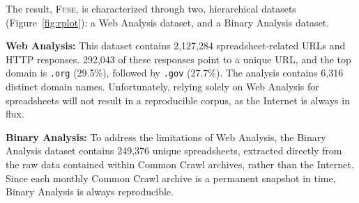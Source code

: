 \documentclass{svjour3}
\newcommand{\urlcount}{2,127,284}
\newcommand{\xlscount}{249,376}
\begin{document}

The result, \textsc{Fuse}, is characterized through two, hierarchical datasets (Figure~\ref{fig:rplot}): a Web Analysis dataset, and a Binary Analysis dataset.

\textbf{Web Analysis:} This dataset contains \urlcount{} spreadsheet-related URLs and HTTP responses. 292,043 of these responses point to a unique URL, and the top domain is \texttt{.org} (29.5\%), followed by \texttt{.gov} (27.7\%). The analysis contains 6,316 distinct domain names. Unfortunately, relying solely on Web Analysis for spreadsheets will not result in a reproducible corpus, as the Internet is always in flux.



\textbf{Binary Analysis:}  To address the limitations of Web Analysis, the Binary Analysis dataset contains \xlscount{} unique spreadsheets, extracted directly from the raw data contained within Common Crawl archives, rather than the Internet. Since each monthly Common Crawl archive is a permanent snapshot in time, Binary Analysis is always reproducible.
\end{document}
